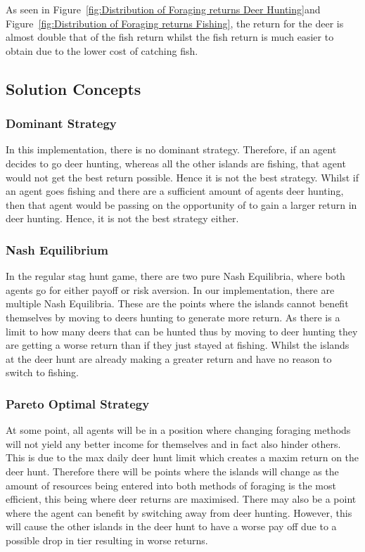 As seen in Figure~\ref{fig:Distribution of Foraging returns Deer Hunting}and Figure~\ref{fig:Distribution of Foraging returns Fishing}, the return for the deer is almost double that of the fish return whilst the fish return is much easier to obtain due to the lower cost of catching fish.

\newpage
\subsection{Solution Concepts}
\subsubsection{Dominant Strategy}

In this implementation, there is no dominant strategy. Therefore, if an agent decides to go deer hunting, whereas all the other islands are fishing, that agent would not get the best return possible. Hence it is not the best strategy. Whilst if an agent goes fishing and there are a sufficient amount of agents deer hunting, then that agent would be passing on the opportunity of to gain a larger return in deer hunting. Hence, it is not the best strategy either.

\subsubsection{Nash Equilibrium}

In the regular stag hunt game, there are two pure Nash Equilibria, where both agents go for either payoff or risk aversion. In our implementation, there are multiple Nash Equilibria. These are the points where the islands cannot benefit themselves by moving to deers hunting to generate more return. As there is a limit to how many deers that can be hunted thus by moving to deer hunting they are getting a worse return than if they just stayed at fishing. Whilst the islands at the deer hunt are already making a greater return and have no reason to switch to fishing.

\subsubsection{Pareto Optimal Strategy}

At some point, all agents will be in a position where changing foraging methods will not yield any better income for themselves and in fact also hinder others. This is due to the max daily deer hunt limit which creates a maxim return on the deer hunt. Therefore there will be points where the islands will change as the amount of resources being entered into both methods of foraging is the most efficient, this being where deer returns are maximised. There may also be a point where the agent can benefit by switching away from deer hunting. However, this will cause the other islands in the deer hunt to have a worse pay off due to a possible drop in tier resulting in worse returns.

